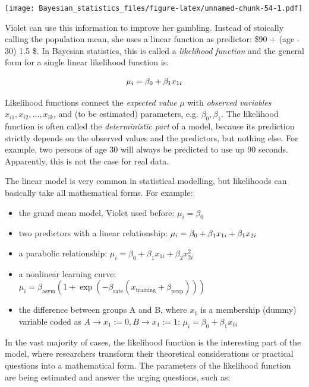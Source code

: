\documentclass[]{svmono}
\providecommand{\tightlist}{%
  \setlength{\itemsep}{0pt}\setlength{\parskip}{0pt}}
\theoremstyle{definition}
\theoremstyle{definition}
\theoremstyle{definition}
\theoremstyle{remark}
\begin{document}
\texttt{[image: Bayesian\_statistics\_files/figure-latex/unnamed-chunk-54-1.pdf]}

Violet can use this information to improve her gambling. Instead of
stoically calling the population mean, she uses a linear function as
predictor: \$90 + (\textrm{age} - 30) 1.5 \$. In Bayesian statistics,
this is called a \emph{likelihood function} and the general form for a
single linear likelihood function is:

\[\mu_i = \beta_0 + \beta_1x_{1i}\\\]

Likelihood functions connect the \emph{expected value} \(\mu\) with
\emph{observed variables} \(x_{i1}, x_{i2}, ..., x_{ik}\), and (to be
estimated) parameters, e.g. \(\beta_0, \beta_1\). The likelihood
function is often called the \emph{deterministic part} of a model,
because its prediction strictly depends on the observed values and the
predictors, but nothing else. For example, two persons of age 30 will
always be predicted to use up 90 seconds. Apparently, this is not the
case for real data.

The linear model is very common in statistical modelling, but
likelihoods can basically take all mathematical forms. For example:

\begin{itemize}
\tightlist
\item
  the grand mean model, Violet used before: \(\mu_i = \beta_0\)
\item
  two predictors with a linear relationship:
  \(\mu_i = \beta_0 + \beta_1x_{1i} + \beta_1x_{2i}\\\)
\item
  a parabolic relationship:
  \(\mu_i = \beta_0 + \beta_1x_{1i} + \beta_2x_{2i}^2\)
\item
  a nonlinear learning curve:
  \(\mu_i = \beta_\textrm{asym} (1 + \exp(-\beta_\textrm{rate}(x_\textrm{training} + \beta_\textrm{pexp})))\)
\item
  the difference between groups A and B, where \(x_1\) is a membership
  (dummy) variable coded as
  \(A\rightarrow x_1:=0, B\rightarrow x_1:=1\):
  \(\mu_i = \beta_0 + \beta_1x_{1i}\)
\end{itemize}

In the vast majority of cases, the likelihood function is the
interesting part of the model, where researchers transform their
theoretical considerations or practical questions into a mathematical
form. The parameters of the likelihood function are being estimated and
answer the urging questions, such as:
\end{document}
